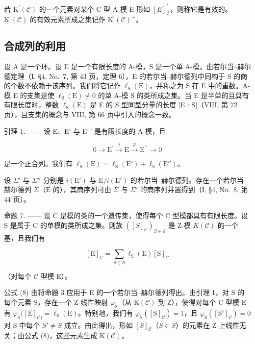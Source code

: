 若 \(\mathrm{K}^{\prime}(\mathcal{C})\) 的一个元素对某个 C 型 A-模 E 形如 \([E]_{\mathcal{C}}^{\prime}\)，则称它是有效的。\(\mathrm{K}^{\prime}(\mathcal{C})\) 的有效元素所成之集记作 \(\mathrm{K}^{\prime}(\mathcal{C})^{+}\)。

\subsection{合成列的利用}

设 A 是一个环。设 E 是一个有限长度的 A-模，S 是一个单 A-模。由若尔当–赫尔德定理（I, §4, No.~7, 第 43 页，定理 6），E 的若尔当–赫尔德列中同构于 S 的商的个数不依赖于该序列。我们将它记作 \(\ell_{\mathrm{S}}(\mathrm{E})\)，并称之为 S 在 E 中的重数。A-模 E 的支集是使 \(\ell_{\mathrm{S}}(\mathrm{E}) \neq 0\) 的单 A-模 S 的类所成之集。当 E 是半单的且具有有限长度时，整数 \(\ell_{\mathrm{S}}(\mathrm{E})\) 是 E 的 S 型同型分量的长度 {[}E : S{]}（VIII, 第 72 页），且支集的概念与 VIII, 第 66 页中引入的概念一致。

引理 1. —— 设 E、E' 与 E'\,' 是有限长度的 A-模，且

\[
0 \longrightarrow \mathrm{E} ^ {\prime} \stackrel {i} {\longrightarrow} \mathrm{E} \stackrel {p} {\longrightarrow} \mathrm{E} ^ {\prime \prime} \longrightarrow 0
\]

是一个正合列。我们有 \(\ell_{\mathrm{S}}(\mathrm{E}) = \ell_{\mathrm{S}}(\mathrm{E}') + \ell_{\mathrm{S}}(\mathrm{E}'')\)。

设 \(\Sigma'\) 与 \(\Sigma''\) 分别是 \(i(\mathrm{E}')\) 与 \(\mathrm{E}/i(\mathrm{E}')\) 的若尔当–赫尔德列。存在一个若尔当–赫尔德列 \(\Sigma\)（\(\mathrm{E}\) 的），其商序列可由 \(\Sigma\) 与 \(\Sigma'\) 的商序列并置得到（I, §4, No.~8, 第 44 页）。

命题 7. —— 设 C 是模的类的一个遗传集，使得每个 C 型模都具有有限长度。设 S 是属于 C 的单模的类所成之集。则族 \(([S]_{\mathcal{C}})_{S \in \mathcal{S}}\) 是 Z-模 \(K(\mathcal{C})\) 的一个基，且我们有

\[
[ \mathrm{E} ] _ {\mathcal {C}} = \sum_ {\mathrm{S} \in \mathcal {S}} \ell_ {\mathrm{S}} (\mathrm{E}) [ \mathrm{S} ] _ {\mathcal {C}}\tag{8}
\]

（对每个 \(\mathcal{C}\) 型模 E）。

公式 (8) 由将命题 3 应用于 E 的一个若尔当–赫尔德列得出。由引理 1，对 S 的每个元素 S，存在一个 Z-线性映射 \(\varphi_{\mathrm{S}}\)（从 \(\mathrm{K}(\mathcal{C})\) 到 Z），使得对每个 C 型模 E 有 \(\varphi_{\mathrm{S}}([\mathrm{E}]_{\mathcal{C})} = \ell_{\mathrm{S}}(\mathrm{E})\)。特别地，我们有 \(\varphi_{\mathrm{S}}([\mathrm{S}]_{\mathcal{C}}) = 1\)，且 \(\varphi_{\mathrm{S}}([\mathrm{S}']_{\mathcal{C}}) = 0\) 对 S 中每个 \(S' \neq S\) 成立。由此得出，形如 \([S]_{\mathcal{C}}\)（\(S \in S\)）的元素在 Z 上线性无关；由公式 (8)，这些元素生成 \(\mathrm{K}(\mathcal{C})\)。

